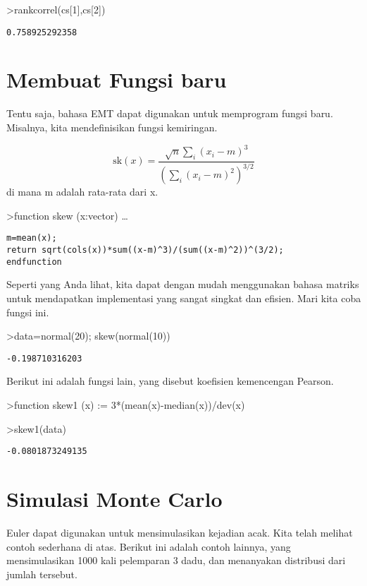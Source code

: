 \documentclass[
]{book}
\begin{document}
\textgreater rankcorrel(cs{[}1{]},cs{[}2{]})

\begin{verbatim}
0.758925292358
\end{verbatim}

\chapter{Membuat Fungsi baru}\label{membuat-fungsi-baru}

Tentu saja, bahasa EMT dapat digunakan untuk memprogram fungsi baru. Misalnya, kita mendefinisikan fungsi kemiringan.

\[\text{sk}(x) = \dfrac{\sqrt{n} \sum_i (x_i-m)^3}{\left(\sum_i (x_i-m)^2\right)^{3/2}}\]di mana m adalah rata-rata dari x.

\textgreater function skew (x:vector) \ldots{}

\begin{verbatim}
m=mean(x);
return sqrt(cols(x))*sum((x-m)^3)/(sum((x-m)^2))^(3/2);
endfunction
\end{verbatim}

Seperti yang Anda lihat, kita dapat dengan mudah menggunakan bahasa matriks untuk mendapatkan implementasi yang sangat singkat dan efisien. Mari kita coba fungsi ini.

\textgreater data=normal(20); skew(normal(10))

\begin{verbatim}
-0.198710316203
\end{verbatim}

Berikut ini adalah fungsi lain, yang disebut koefisien kemencengan Pearson.

\textgreater function skew1 (x) := 3*(mean(x)-median(x))/dev(x)

\textgreater skew1(data)

\begin{verbatim}
-0.0801873249135
\end{verbatim}

\chapter{Simulasi Monte Carlo}\label{simulasi-monte-carlo}

Euler dapat digunakan untuk mensimulasikan kejadian acak. Kita telah melihat contoh sederhana di atas. Berikut ini adalah contoh lainnya, yang mensimulasikan 1000 kali pelemparan 3 dadu, dan menanyakan distribusi dari jumlah tersebut.
\end{document}

